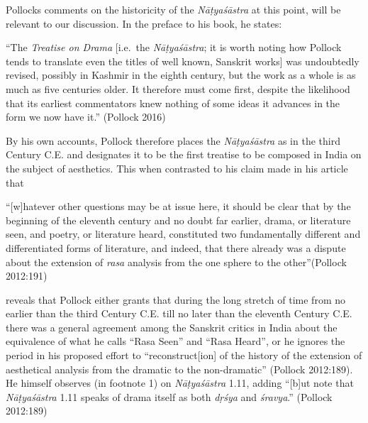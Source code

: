 Pollocks comments on the historicity of the \textsl{Nāṭyaśāstra} at this point, will be relevant to our discussion. In the preface to his book, he states:

\begin{myquote}
“The \textsl{Treatise on Drama} [i.e.~the \textsl{Nāṭyaśāstra}; it is worth noting how Pollock tends to translate even the titles of well known, Sanskrit works] was undoubtedly revised, possibly in Kashmir in the eighth century, but the work as a whole is as much as five centuries older. It therefore must come first, despite the likelihood that its earliest commentators knew nothing of some ideas it advances in the form we now have it.” 
\hfill (Pollock 2016) 
\end{myquote}

By his own accounts, Pollock therefore places the \textsl{Nāṭyaśāstra} as in the third Century C.E. and designates it to be the first treatise to be composed in India on the subject of aesthetics. This when contrasted to his claim made in his article that 

\begin{myquote}
“[w]hatever other questions may be at issue here, it should be clear that by the beginning of the eleventh century and no doubt far earlier, drama, or literature seen, and poetry, or literature heard, constituted two fundamentally different and differentiated forms of literature, and indeed, that there already was a dispute about the extension of \textsl{rasa} analysis from the one sphere to the other”\hfill (Pollock 2012:191) 
\end{myquote}

reveals that Pollock either grants that during the long stretch of time from no earlier than the third Century C.E. till no later than the eleventh Century C.E. there was a general agreement among the Sanskrit critics in India about the equivalence of what he calls “Rasa Seen” and “Rasa Heard”, or he ignores the period in his proposed effort to “reconstruct[ion] of the history of the extension of aesthetical analysis from the dramatic to the non-dramatic” (Pollock 2012:189). He himself observes (in footnote 1) on \textsl{Nāṭyaśāstra} 1.11, adding “[b]ut note that \textsl{Nāṭyaśāstra} 1.11 speaks of drama itself as both \textsl{dṛśya} and \textsl{śravya}.” (Pollock 2012:189) 

